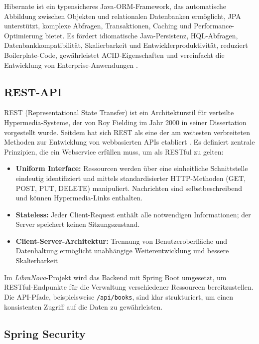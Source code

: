 Hibernate ist ein typensicheres Java-ORM-Framework, das automatische Abbildung zwischen Objekten und relationalen Datenbanken ermöglicht, JPA unterstützt, komplexe Abfragen, Transaktionen, Caching und Performance-Optimierung bietet. Es fördert idiomatische Java-Persistenz, HQL-Abfragen, Datenbankkompatibilität, Skalierbarkeit und Entwicklerproduktivität, reduziert Boilerplate-Code, gewährleistet ACID-Eigenschaften und vereinfacht die Entwicklung von Enterprise-Anwendungen \cite{HIBERNATE2025}.

\subsection{REST-API}

\noindent REST (Representational State Transfer) ist ein Architekturstil für verteilte Hypermedia-Systeme, der von Roy Fielding im Jahr 2000 in seiner Dissertation vorgestellt wurde. Seitdem hat sich REST als eine der am weitesten verbreiteten Methoden zur Entwicklung von webbasierten APIs etabliert \cite{GUPTA2025}. Es definiert zentrale Prinzipien, die ein Webservice erfüllen muss, um als RESTful zu gelten:

\begin{itemize}
	\item \textbf{Uniform Interface:} Ressourcen werden über eine einheitliche Schnittstelle eindeutig identifiziert und mittels standardisierter HTTP-Methoden (GET, POST, PUT, DELETE) manipuliert. Nachrichten sind selbstbeschreibend und können Hypermedia-Links enthalten.
	\item \textbf{Stateless:} Jeder Client-Request enthält alle notwendigen Informationen; der Server speichert keinen Sitzungszustand.
	\item \textbf{Client-Server-Architektur:} Trennung von Benutzeroberfläche und Datenhaltung ermöglicht unabhängige Weiterentwicklung und bessere Skalierbarkeit \cite{GUPTA2025}
\end{itemize}

\noindent Im \textit{LibraNova}-Projekt wird das Backend mit Spring Boot umgesetzt, um RESTful-Endpunkte für die Verwaltung verschiedener Ressourcen bereitzustellen. Die API-Pfade, beispielsweise \texttt{/api/books}, sind klar strukturiert, um einen konsistenten Zugriff auf die Daten zu gewährleisten.

\subsection{Spring Security}

